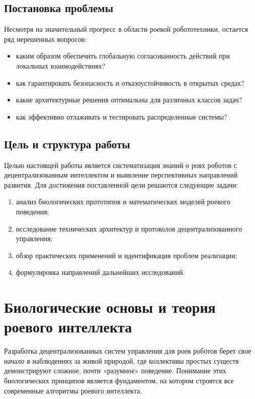 \documentclass[12pt, a4paper]{article}
\begin{document}
\subsection{Постановка проблемы}
Несмотря на значительный прогресс в области роевой робототехники, остается ряд нерешенных вопросов:
\begin{itemize}
    \item каким образом обеспечить глобальную согласованность действий при локальных взаимодействиях?
    \item как гарантировать безопасность и отказоустойчивость в открытых средах?
    \item какие архитектурные решения оптимальны для различных классов задач?
    \item как эффективно отлаживать и тестировать распределенные системы?
\end{itemize}

\subsection{Цель и структура работы}
Целью настоящей работы является систематизация знаний о роях роботов с децентрализованным интеллектом и выявление перспективных направлений развития. Для достижения поставленной цели решаются следующие задачи:
\begin{enumerate}
    \item анализ биологических прототипов и математических моделей роевого поведения;
    \item исследование технических архитектур и протоколов децентрализованного управления;
    \item обзор практических применений и идентификация проблем реализации;
    \item формулировка направлений дальнейших исследований.
\end{enumerate}

\section{Биологические основы и теория роевого интеллекта}

Разработка децентрализованных систем управления для роев роботов берет свое начало в наблюдениях за живой природой, где коллективы простых существ демонстрируют сложное, почти «разумное» поведение. Понимание этих биологических принципов является фундаментом, на котором строятся все современные алгоритмы роевого интеллекта.
\end{document}
